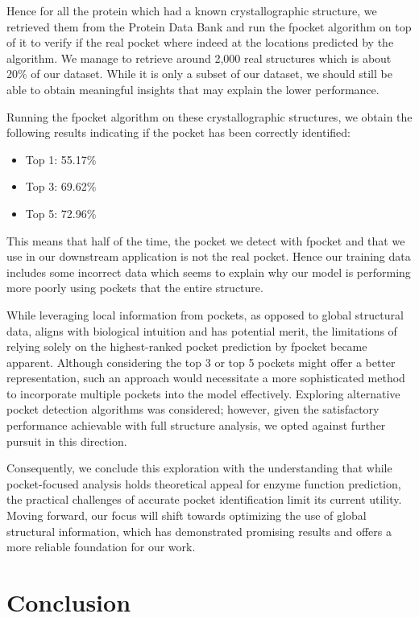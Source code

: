 Hence for all the protein which had a known crystallographic structure, we retrieved them from the Protein Data Bank and run the fpocket algorithm on top of it to verify if the real pocket where indeed at the locations predicted by the algorithm. We manage to retrieve around 2,000 real structures which is about 20\% of our dataset. While it is only a subset of our dataset, we should still be able to obtain meaningful insights that may explain the lower performance.

Running the fpocket algorithm on these crystallographic structures, we obtain the following results indicating if the pocket has been correctly identified:
\begin{itemize}
  \item Top 1: 55.17\%
  \item Top 3: 69.62\%
  \item Top 5: 72.96\%
\end{itemize}
This means that half of the time, the pocket we detect with fpocket and that we use in our downstream application
is not the real pocket. Hence our training data includes some incorrect data which seems to explain why
our model is performing more poorly using pockets that the entire structure.

While leveraging local information from pockets, as opposed to global structural data, aligns with biological intuition and has potential merit, the limitations of relying solely on the highest-ranked pocket prediction by fpocket became apparent. Although considering the top 3 or top 5 pockets might offer a better representation, such an approach would necessitate a more sophisticated method to incorporate multiple pockets into the model effectively. Exploring alternative pocket detection algorithms was considered; however, given the satisfactory performance achievable with full structure analysis, we opted against further pursuit in this direction.

Consequently, we conclude this exploration with the understanding that while pocket-focused analysis holds theoretical appeal for enzyme function prediction, the practical challenges of accurate pocket identification limit its current utility. Moving forward, our focus will shift towards optimizing the use of global structural information, which has demonstrated promising results and offers a more reliable foundation for our work.

\section{Conclusion}

